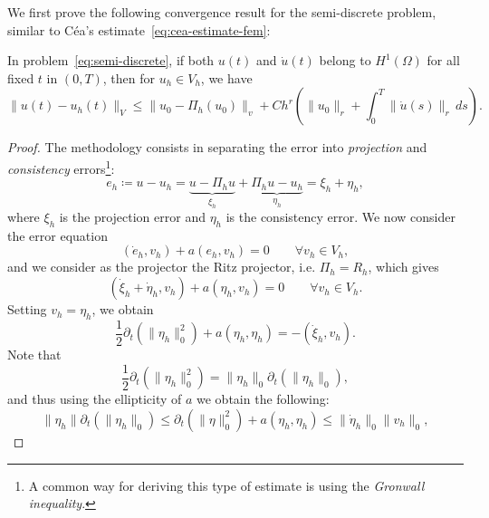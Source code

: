 We first prove the following convergence result for the semi-discrete problem, similar to Céa's estimate~\ref{eq:cea-estimate-fem}:
\begin{theorem}\label{thm:convergence-semidiscrete-time}
    In problem~\eqref{eq:semi-discrete}, if both $u(t)$ and $\dot u(t)$ belong to $H^1(\Omega)$ for all fixed $t$ in $(0,T)$, then for $u_h\in V_h$, we have
    \begin{equation}
        \| u(t) - u_h(t) \|_V \leq \|u_0 - \Pi_h(u_0)\|_v + Ch^r\left(\|u_0\|_r+\int_0^T\|\dot u(s)\|_r\,ds\right).
    \end{equation}
    \begin{proof}
        The methodology consists in separating the error into \emph{projection} and \emph{consistency} errors\footnote{A common way for deriving this type of estimate is using the \emph{Gronwall inequality}.}: 
        \begin{equation*}
            e_h \coloneqq u - u_h = \underbrace{u - \Pi_h u}_{\xi_h} + \underbrace{\Pi_h u - u_h}_{\eta_h} = \xi_h + \eta_h,
        \end{equation*}
        where $\xi_h$ is the projection error and $\eta_h$ is the consistency error. We now consider the error equation
        \begin{equation*}
            (\dot e_h, v_h) + a(e_h, v_h) = 0 \qquad \forall v_h\in V_h,
        \end{equation*}
        and we consider as the projector the Ritz projector, i.e. $\Pi_h=R_h$, which gives
        \begin{equation*}
            (\dot \xi_h + \dot \eta_h, v_h) + a(\eta_h, v_h) = 0 \qquad \forall v_h\in V_h.
        \end{equation*}
        Setting $v_h = \eta_h$, we obtain 
        \begin{equation*}
            \frac 1 2 \partial_t(\|\eta_h\|^2_0)+a(\eta_h,\eta_h) = -(\dot \xi_h, v_h).
        \end{equation*}
        Note that 
        \begin{equation*}
            \frac 1 2 \partial_t(\|\eta_h\|_0^2) = \|\eta_h\|_0 \partial_t(\|\eta_h\|_0),
        \end{equation*}
        and thus using the ellipticity of $a$ we obtain the following: 
        \begin{equation*}
            \|\eta_h\|\partial_t(\|\eta_h\|_0) \leq \partial_t(\|\eta\|_0^2) + a(\eta_h, \eta_h) \leq \|\dot \eta_h\|_0 \|v_h\|_0,
        \end{equation*}

\end{proof}
\end{theorem}
